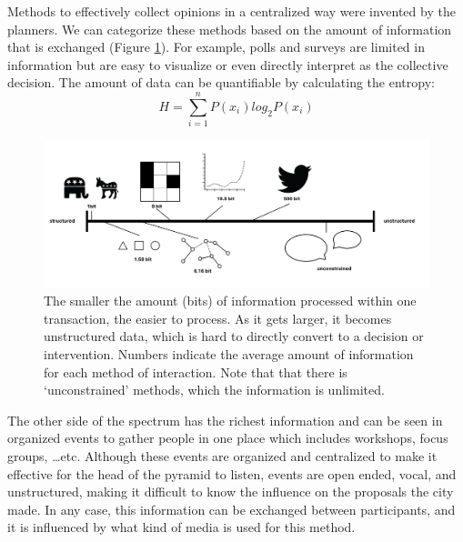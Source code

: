 Methods to effectively collect opinions in a centralized way 
were invented by the planners. We can categorize these methods based on the amount of information that is exchanged (Figure \ref{fig:spectrum}).  For example, polls and surveys are limited in information but are easy to visualize or even directly interpret as the collective decision. The amount of data can be quantifiable by calculating the entropy\cite{shannon1998mathematical}:
\[ H = \sum_{i=1}^{n}P(x_i)log_2P(x_i) \]
\begin{figure}[!htb]
  \includegraphics[width=\textwidth]{chapters/2/fig/spectrum.png}               
  \caption[number of bits per transaction]{
  The smaller the amount (bits) of information processed within one transaction,
  the easier to process. As it gets larger, it becomes unstructured data, which is hard to directly convert to a decision or
  intervention. Numbers indicate the average amount of information for each method of interaction.
  Note that that there is `unconstrained' methods, which the information is unlimited.
  }
  \label{fig:spectrum}
\end{figure}
The other side of the spectrum has the richest information and can be seen in organized events to gather people in one place which includes workshops, focus groups, \dots etc. Although these events are organized and centralized to make it effective for the head of the pyramid to listen, events are open ended, vocal, and unstructured, making it difficult to know the influence on the proposals the city made.  In any case, this information can be exchanged between participants, and it is influenced by what kind of media is used for this method.
